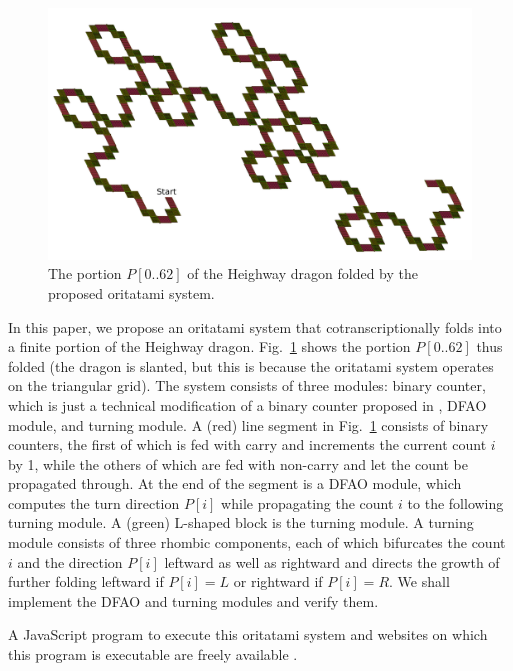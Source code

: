 \begin{figure}
\centering
\includegraphics[width=\linewidth]{pic/6bit_heighway.pdf}
\caption{The portion $P[0 .. 62]$ of the Heighway dragon folded by the proposed oritatami system.}
\label{fig:heighway6_oritatami}
\end{figure}

In this paper, we propose an oritatami system that cotranscriptionally folds into a finite portion of the Heighway dragon. 
Fig.~\ref{fig:heighway6_oritatami} shows the portion $P[0 .. 62]$ thus folded (the dragon is slanted, but this is because the oritatami system operates on the triangular grid). 
The system consists of three modules: binary counter, which is just a technical modification of a binary counter proposed in \cite{GeMeScSe2016}, DFAO module, and turning module. 
A (red) line segment in Fig.~\ref{fig:heighway6_oritatami} consists of binary counters, the first of which is fed with carry and increments the current count $i$ by 1, while the others of which are fed with non-carry and let the count be propagated through. 
At the end of the segment is a DFAO module, which computes the turn direction $P[i]$ while propagating the count $i$ to the following turning module. 
A (green) L-shaped block is the turning module. 
A turning module consists of three rhombic components, each of which bifurcates the count $i$ and the direction $P[i]$ leftward as well as rightward and directs the growth of further folding leftward if $P[i] = L$ or rightward if $P[i] = R$. 
We shall implement the DFAO and turning modules and verify them. 

A JavaScript program to execute this oritatami system and websites on which this program is executable are freely available \cite{heighway_web}. 

